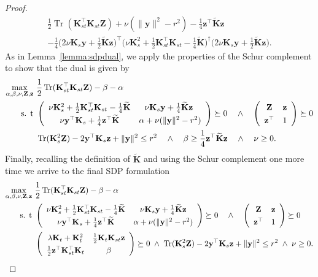 \documentclass[twoside,11pt]{article}
\DeclareMathOperator{\Tr}{Tr}
\newcommand{\wt}{\widetilde}
\newcommand{\mat}[1]{{\mathbf #1}}
\newcommand{\1}{\mat{1}}
\newcommand{\Ks}{\mat{K}_s}
\newcommand{\Kst}{\mat{K}_{st}}
\newcommand{\Kt}{\mat{K}_{t}}
\newcommand{\y}{\mat{y}}
\newcommand{\z}{\mat{z}}
\newcommand{\Z}{\mat{Z}}
\begin{document}
\begin{proof}
\begin{multline*}
 \frac{1}{2} \Tr(\Kst^\top \Kst \Z) + \nu(\|\y\|^2 - r^2)
- \frac{1}{4} \z^\top \wt{\mat K} \z  \\
- \frac{1}{4} \Big(2 \nu  \Ks \y + \frac{1}{2}\wt{\mat K} \z\Big)^\top
\Big(\nu \Ks^2 + \frac{1}{2}\Kst^\top \Kst - \frac{1}{4} \wt{\mat K}\Big)^\dag
\Big(2 \nu  \Ks \y + \frac{1}{2}\wt{\mat K} \z\Big).
\end{multline*}
As in Lemma~\ref{lemma:sdpdual}, we apply the properties of the Schur
complement to show that the dual is given by
\begin{align*}
\max_{\alpha, \beta, \nu, \Z, \z} & \ \frac{1}{2} \Tr(\Kst^\top \Kst \Z)
- \beta - \alpha\\
\text{s. t} & \ \left(
\def\arraystretch{1.3}
\begin{array}{cc}
\nu \Ks^2 + \frac{1}{2}\Kst^\top \Kst - \frac{1}{4} \wt{\mat K}
& \nu  \Ks \y + \frac{1}{4}\wt{\mat K} \z\  \\
\nu \y^\top  \Ks + \frac{1}{4} \z^\top \wt{\mat K}
&\alpha + \nu (\|\y\|^2 - r^2)
\end{array}
\right) \succeq 0 \quad \wedge \quad
\left(
\begin{array}{cc}
\Z & \z \\
\z^\top & 1
\end{array}
\right) \succeq 0 \\
& \ \Tr(\Ks^2 \Z) - 2\y^\top \Ks \z + \|\y\|^2 \leq r^2
\quad \wedge \quad \beta \geq \frac{1}{4} \z^\top \wt{\mat K} \z
\quad \wedge \quad \nu \geq 0.
\end{align*}
Finally, recalling the definition of $\wt{\mat K}$ and using the
Schur complement one more time we arrive to the final SDP formulation
\begin{align*}
\max_{\alpha, \beta, \nu, \Z, \z} & \ \frac{1}{2} \Tr(\Kst^\top \Kst \Z)
- \beta - \alpha\\
\text{s. t} & \ \left(
\def\arraystretch{1.3}
\begin{array}{cc}
\nu \Ks^2 + \frac{1}{2}\Kst^\top \Kst - \frac{1}{4} \wt{\mat K}
& \nu  \Ks \y + \frac{1}{4}\wt{\mat K} \z \\
\nu  \y^\top \Ks + \frac{1}{4} \z^\top \wt{\mat K}
&\alpha + \nu (\|\y\|^2 - r^2)
\end{array}
\right) \succeq 0 \quad \wedge \quad
\left(
\begin{array}{cc}
\Z & \z \\
\z^\top & 1
\end{array}
\right) \succeq 0 \\
& \ \left(
\def\arraystretch{1.3}
\begin{array}{cc}
\lambda \Kt + \Kt^2 & \frac{1}{2} \Kt \Kst \z \\
\frac{1}{2} \z^\top \Kst^\top \Kt & \beta
\end{array}
\right) \succeq 0
\; \wedge \; \Tr(\Ks^2 \Z) - 2\y^\top \Ks \z + \|\y\|^2 \leq r^2
\; \wedge \; \nu \geq 0.
\end{align*}
\end{proof}
\end{document}
